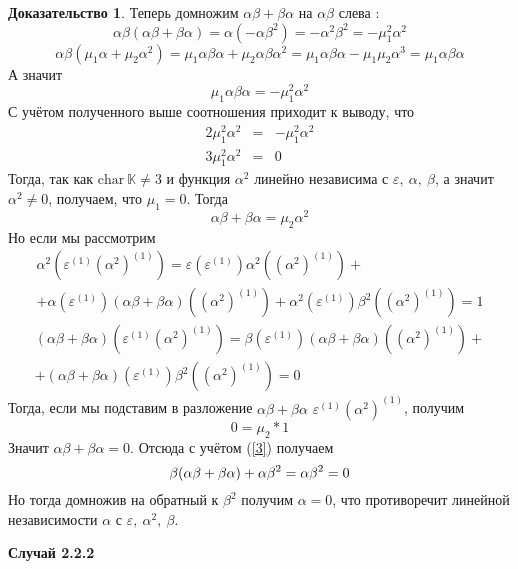 \documentclass[a4paper, 12pt]{article}
\theoremstyle{definition}
\newtheorem*{prof}{\hspace*{\parindent}Доказательство}
\begin{document}
\begin{prof}
    Теперь домножим $\alpha\beta+\beta\alpha$ на $\alpha\beta$ слева :
    \[
        \alpha\beta(\alpha\beta+\beta\alpha) = \alpha(-\alpha\beta^2) = -\alpha^2\beta^2 = -\mu_1^2\alpha^2
    \]
    \[
        \alpha\beta(\mu_1\alpha+\mu_2\alpha^2) = \mu_1\alpha\beta\alpha+\mu_2\alpha\beta\alpha^2=\mu_1\alpha\beta\alpha-\mu_1\mu_2\alpha^3 = \mu_1\alpha\beta\alpha
    \]
    А значит \[
    \mu_1\alpha\beta\alpha = -\mu_1^2\alpha^2
    \]
    С учётом полученного выше соотношения приходит к выводу, что 
    \begin{eqnarray*}
        2\mu_1^2\alpha^2 &=& -\mu_1^2\alpha^2\\
        3\mu_1^2\alpha^2 &=& 0
    \end{eqnarray*}
    Тогда, так как $\mathrm{char}\ \mathbb{K} \neq 3$ и функция $\alpha^2$ линейно независима с $\varepsilon,\ \alpha,\ \beta$, а значит $\alpha^2 \neq 0$, получаем, что $\mu_1 =0 $.
    Тогда \[
    \alpha\beta+\beta\alpha = \mu_2\alpha^2
    \]
    Но если мы рассмотрим
    \begin{multline*}
        \alpha^2 \left(\varepsilon^{(1)}\left(\alpha^2\right)^{(1)} \right) = \varepsilon(\varepsilon^{(1)})\alpha^2 \left(\left(\alpha^2\right)^{(1)}\right) +
        \\
        +\alpha(\varepsilon^{(1)})(\alpha\beta+\beta\alpha)\left(\left(\alpha^2\right)^{(1)}\right) + \alpha^2(\varepsilon^{(1)}) \beta^2 \left(\left(\alpha^2\right)^{(1)}\right) = 1
    \end{multline*}
    \begin{multline*}
        (\alpha\beta+\beta\alpha)\left(\varepsilon^{(1)}\left(\alpha^2\right)^{(1)} \right) = \beta(\varepsilon^{(1)})(\alpha\beta+\beta\alpha)\left(\left(\alpha^2\right)^{(1)}\right)+
        \\
        +(\alpha\beta+\beta\alpha)(\varepsilon^{(1)})\beta^2\left(\left(\alpha^2\right)^{(1)}\right) = 0
    \end{multline*}
    Тогда, если мы подставим в разложение $\alpha\beta+\beta\alpha$ $\varepsilon^{(1)}\left(\alpha^2\right)^{(1)}$, получим \[
    0 = \mu_2*1
    \]
    Значит $\alpha\beta+\beta\alpha = 0$. Отсюда с учётом (\ref{3}) получаем 
    \[
        \beta(\alpha\beta+\beta\alpha)+\alpha\beta^2 = \alpha\beta^2 = 0\\
    \]
    Но тогда домножив на обратный к $\beta^2$ получим $\alpha =0$, что противоречит линейной независимости $\alpha$ с $\varepsilon,\ \alpha^2,\ \beta$.
    
    \textbf{Случай 2.2.2}


\end{prof}
\end{document}
